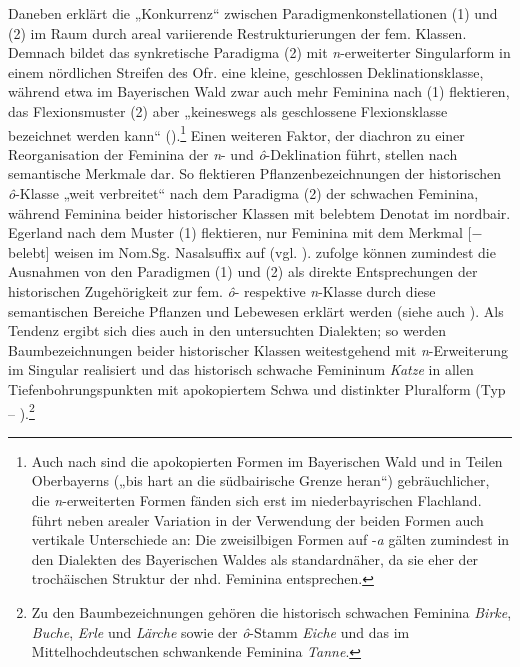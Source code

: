 Daneben erklärt \citet[161]{Rowley1997} die „Konkurrenz“ zwischen Paradigmenkonstellationen (1) und (2) im Raum durch areal variierende Restrukturierungen der fem. Klassen. Demnach bildet das synkretische Paradigma (2) mit \textit{n}{}-erweiterter Singularform in einem nördlichen Streifen des Ofr. eine kleine, geschlossen Deklinationsklasse, während etwa im Bayerischen Wald zwar auch mehr Feminina nach (1) flektieren, das Flexionsmuster (2) aber „keineswegs als geschlossene Flexionsklasse bezeichnet werden kann“ (\citealt[161 und Karte 37]{Rowley1997}).\footnote{Auch nach \citet[15--16]{Mausser1915} sind die apokopierten Formen im Bayerischen Wald und in Teilen Oberbayerns („bis hart an die südbairische Grenze heran“) gebräuchlicher, die \textit{n}{}-erweiterten Formen fänden sich erst im niederbayrischen Flachland. \citet[17]{Mausser1915} führt neben arealer Variation in der Verwendung der beiden Formen auch vertikale Unterschiede an: Die zweisilbigen Formen auf -\textit{a} gälten zumindest in den Dialekten des Bayerischen Waldes als standardnäher, da sie eher der trochäischen Struktur der nhd. Feminina entsprechen.}  Einen weiteren Faktor, der diachron zu einer Reorganisation der Feminina der \textit{n}{}- und \textit{ô}{}-Deklination führt, stellen nach \citet{Rowley1997} semantische Merkmale dar. So flektieren Pflanzenbezeichnungen der historischen \textit{ô}{}-Klasse „weit verbreitet“ \citep[192]{Rowley1997} nach dem Paradigma (2) der schwachen Feminina, während Feminina beider historischer Klassen mit belebtem Denotat im nordbair. Egerland nach dem Muster (1) flektieren, nur Feminina mit dem Merkmal [$-$belebt] weisen im Nom.Sg. Nasalsuffix auf (vgl. \citealt[183]{HarnischRowley1990}). \citet[192]{Rowley1997} zufolge können zumindest die Ausnahmen von den Paradigmen (1) und (2) als direkte Entsprechungen der historischen Zugehörigkeit zur fem. \textit{ô}{}- respektive \textit{n}{}-Klasse durch diese semantischen Bereiche Pflanzen und Lebewesen erklärt werden (siehe auch \citealt[§850]{Schmeller1821}). Als Tendenz ergibt sich dies auch in den untersuchten Dialekten; so werden Baumbezeichnungen beider historischer Klassen weitestgehend mit \textit{n}{}-Erweiterung im Singular realisiert und das historisch schwache Femininum \textit{Katze} in allen Tiefenbohrungspunkten mit apokopiertem Schwa und distinkter Pluralform (Typ  -- ).\footnote{Zu den Baumbezeichnungen gehören die historisch schwachen Feminina \textit{Birke}, \textit{Buche}, \textit{Erle} und \textit{Lärche} sowie der \textit{ô}{}-Stamm \textit{Eiche} und das im Mittelhochdeutschen schwankende Feminina \textit{Tanne}.}

